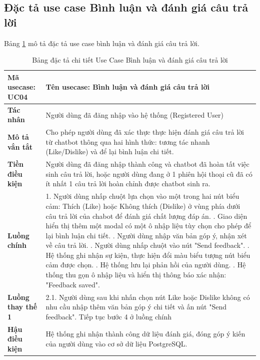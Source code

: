 \documentclass[../DoAn.tex]{subfiles}
\begin{document}
\subsection{Đặc tả use case Bình luận và đánh giá câu trả lời}
Bảng \ref{table:uc_specs_feedback} mô tả đặc tả use case bình luận và đánh giá câu trả lời.
\begin{table}[H]
\centering
\begin{tabular}{|p{3.5cm}|p{11.5cm}|}
\hline
\textbf{Mã usecase:} UC04 & \textbf{Tên usecase:} Bình luận và đánh giá câu trả lời \\ \hline
\textbf{Tác nhân} & Người dùng đã đăng nhập vào hệ thống (Registered User) \\ \hline
\textbf{Mô tả vắn tắt} & Cho phép người dùng đã xác thực thực hiện đánh giá câu trả lời từ chatbot thông qua hai hình thức: tương tác nhanh (Like/Dislike) và để lại bình luận chi tiết. \\ \hline
\textbf{Tiền điều kiện} & Người dùng đã đăng nhập thành công và chatbot đã hoàn tất việc sinh câu trả lời, hoặc người dùng đang ở 1 phiên hội thoại cũ đã có ít nhất 1 câu trả lời hoàn chỉnh được chatbot sinh ra. \\ \hline
\textbf{Luồng chính} & 
1. Người dùng nhấp chuột lựa chọn vào một trong hai nút biểu cảm: Thích (Like) hoặc Không thích (Dislike) ở vùng phía dưới câu trả lời của chabot để đánh giá chất lượng đáp án. \newline
2. Giao diện hiển thị thêm một modal có một ô nhập liệu tùy chọn cho phép để lại bình luận chi tiết. \newline
3. Người dùng nhập văn bản góp ý, nhận xét về câu trả lời. \newline
4. Người dùng nhấp chuột vào nút "Send feedback". \newline
5. Hệ thống ghi nhận sự kiện, thực hiện đổi màu biểu tượng nút biểu cảm được chọn. \newline
6. Hệ thống lưu lại phản hồi của người dùng. \newline
7. Hệ thống thu gọn ô nhập liệu và hiển thị thông báo xác nhận: "Feedback saved". \\ \hline
\textbf{Luồng thay thế 1} & 
2.1. Người dùng sau khi nhấn chọn nút Like hoặc Dislike không có nhu cầu nhập thêm văn bản góp ý chi tiết và ấn nút "Send feedback". Tiếp tục bước 4 ở luồng chính \\ \hline
\textbf{Hậu điều kiện} & Hệ thống ghi nhận thành công dữ liệu đánh giá, đóng góp ý kiến của người dùng vào cơ sở dữ liệu PostgreSQL. \\ \hline
\end{tabular}
\caption{Bảng đặc tả chi tiết Use Case Bình luận và đánh giá câu trả lời}
\label{table:uc_specs_feedback}
\end{table}
\end{document}
